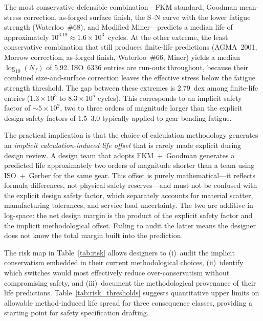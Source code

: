 \documentclass[twocolumn,12pt,a4paper]{article}
\begin{document}
The most conservative defensible combination---FKM standard, Goodman
mean-stress correction, as-forged surface finish, the S--N curve with
the lower fatigue strength (Waterloo~\#68), and Modified Miner---predicts a
median life of approximately $10^{3.19} \approx 1.6\times10^3$~cycles.
At the other extreme, the least conservative combination that still
produces finite-life predictions (AGMA~2001, Morrow correction,
as-forged finish, Waterloo~\#66, Miner) yields a median
$\log_{10}(N_f)$ of 5.92. ISO~6336 entries are run-outs throughout,
because their combined size-and-surface correction leaves the
effective stress below the fatigue strength threshold. The gap between
these extremes is 2.79~dex among finite-life entries
($1.3\times10^3$ to $8.3\times10^5$ cycles). This corresponds to an
implicit safety factor of $\sim$$5 \times 10^2$, two to three orders
of magnitude larger than the explicit design safety factors of
1.5--3.0 typically applied to gear bending fatigue.

The practical implication is that the choice of calculation methodology
generates an \emph{implicit calculation-induced life offset} that is
rarely made explicit during design review. A design team that adopts
FKM~+~Goodman generates a predicted life approximately two orders of
magnitude shorter than a team using ISO~+~Gerber for the same gear.
This offset is purely mathematical---it reflects formula differences, not
physical safety reserves---and must not be confused with the explicit
design safety factor, which separately accounts for material scatter,
manufacturing tolerances, and service load uncertainty. The two are
additive in log-space: the net design margin is the product of the
explicit safety factor and the implicit methodological offset. Failing
to audit the latter means the designer does not know the total margin
built into the prediction.

The risk map in Table~\ref{tab:risk} allows designers to (i)~audit the
implicit conservatism embedded in their current methodological choices,
(ii)~identify which switches would most effectively reduce
over-conservatism without compromising safety, and (iii)~document the
methodological provenance of their life predictions. Table~\ref{tab:risk_thresholds}
suggests quantitative upper limits on allowable method-induced
life spread for three consequence classes, providing a starting
point for safety specification drafting.
\end{document}
